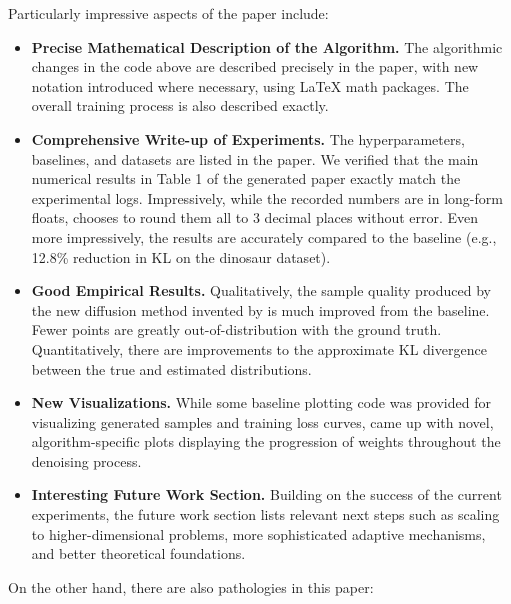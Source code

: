 \begin{appendices}
Particularly impressive aspects of the paper include:
\begin{itemize}
\item \textbf{Precise Mathematical Description of the Algorithm.} The algorithmic changes in the code above are described precisely in the paper, with new notation introduced where necessary, using LaTeX math packages. The overall training process is also described exactly.
\item \textbf{Comprehensive Write-up of Experiments.} The hyperparameters, baselines, and datasets are listed in the paper.
We verified that the main numerical results in Table 1 of the generated paper exactly match the experimental logs. Impressively, while the recorded numbers are in long-form floats, \ouralgo chooses to round them all to 3 decimal places without error. Even more impressively, the results are accurately compared to the baseline (e.g., 12.8\% reduction in KL on the dinosaur dataset).
\item \textbf{Good Empirical Results.} Qualitatively, the sample quality produced by the new diffusion method invented by \ouralgo is much improved from the baseline. Fewer points are greatly out-of-distribution with the ground truth. Quantitatively, there are improvements to the approximate KL divergence between the true and estimated distributions.
\item \textbf{New Visualizations.} While some baseline plotting code was provided for visualizing generated samples and training loss curves, \ouralgo came up with novel, algorithm-specific plots displaying the progression of weights throughout the denoising process.
\item \textbf{Interesting Future Work Section.} Building on the success of the current experiments, the future work section lists relevant next steps such as scaling to higher-dimensional problems, more sophisticated adaptive mechanisms, and better theoretical foundations.
\end{itemize}

On the other hand, there are also pathologies in this paper:


\end{appendices}
